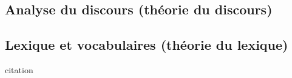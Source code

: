 \documentclass[a4paper,10pt]{article}
\begin{document}
	\subsection{Analyse du discours (théorie du discours)}
	\subsection{Lexique et vocabulaires (théorie du lexique)}






\begin{center}
	\footnotesize
	\begin{minipage}{0.7\textwidth}
		citation
	\end{minipage}
\end{center}
\medskip


\end{document}
